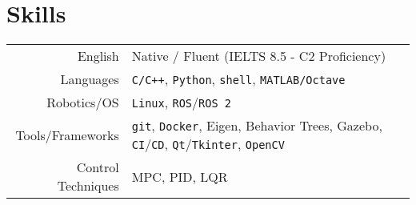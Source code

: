 \documentclass[a4paper,10pt,twoside]{article}
\begin{document}
\section{\textbf{Skills}}\verticalspacebetweensectionandcontent

\begin{center}
\begin{tabular}{rl}
English & Native / Fluent (IELTS 8.5 - C2 Proficiency) \\
Languages & \texttt{C/C++}, \texttt{Python}, \texttt{shell}, \texttt{MATLAB/Octave} \\
Robotics/OS & \texttt{Linux},  \texttt{ROS}/\texttt{ROS 2} \\
Tools/Frameworks & \texttt{git}, \texttt{Docker}, Eigen, Behavior Trees, Gazebo, \texttt{CI}/\texttt{CD}, \texttt{Qt}/\texttt{Tkinter}, \texttt{OpenCV} \\
Control Techniques & MPC, PID, LQR
\end{tabular}
\end{center}
\verticalspacebetweensections

\vfill
\end{document}
